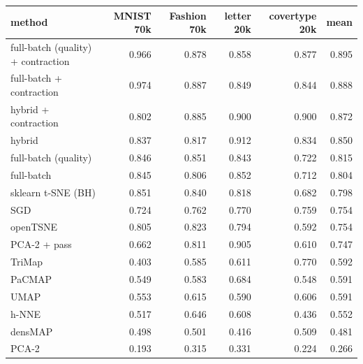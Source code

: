 \begin{tabular}{lrrrrr}
\toprule
method & MNIST 70k & Fashion 70k & letter 20k & covertype 20k & mean \\
\midrule
\magnet{} full-batch (quality) + contraction & 0.966 & 0.878 & 0.858 & 0.877 & 0.895 \\
\magnet{} full-batch + contraction & 0.974 & 0.887 & 0.849 & 0.844 & 0.888 \\
\magnet{} hybrid + contraction & 0.802 & 0.885 & 0.900 & 0.900 & 0.872 \\
\magnet{} hybrid & 0.837 & 0.817 & 0.912 & 0.834 & 0.850 \\
\magnet{} full-batch (quality) & 0.846 & 0.851 & 0.843 & 0.722 & 0.815 \\
\magnet{} full-batch & 0.845 & 0.806 & 0.852 & 0.712 & 0.804 \\
sklearn t-SNE (BH) & 0.851 & 0.840 & 0.818 & 0.682 & 0.798 \\
\magnet{} SGD & 0.724 & 0.762 & 0.770 & 0.759 & 0.754 \\
openTSNE & 0.805 & 0.823 & 0.794 & 0.592 & 0.754 \\
PCA-2 + pass & 0.662 & 0.811 & 0.905 & 0.610 & 0.747 \\
TriMap & 0.403 & 0.585 & 0.611 & 0.770 & 0.592 \\
PaCMAP & 0.549 & 0.583 & 0.684 & 0.548 & 0.591 \\
UMAP & 0.553 & 0.615 & 0.590 & 0.606 & 0.591 \\
h-NNE & 0.517 & 0.646 & 0.608 & 0.436 & 0.552 \\
densMAP & 0.498 & 0.501 & 0.416 & 0.509 & 0.481 \\
PCA-2 & 0.193 & 0.315 & 0.331 & 0.224 & 0.266 \\
\bottomrule
\end{tabular}
